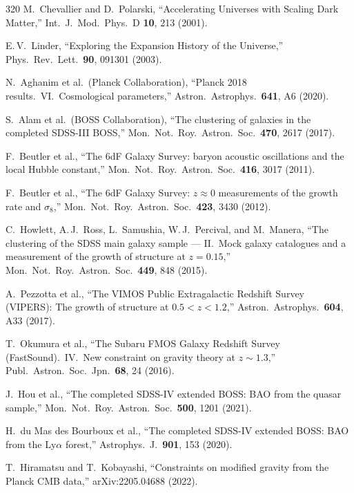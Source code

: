 \begin{thebibliography}{320}
M.\ Chevallier and D.\ Polarski,
``Accelerating Universes with Scaling Dark Matter,''
Int.\ J.\ Mod.\ Phys.\ D \textbf{10}, 213 (2001).

E.\,V.\ Linder,
``Exploring the Expansion History of the Universe,''
Phys.\ Rev.\ Lett.\ \textbf{90}, 091301 (2003).

N.\ Aghanim et al.\ (Planck Collaboration),
``Planck 2018 results.\ VI.\ Cosmological parameters,''
Astron.\ Astrophys.\ \textbf{641}, A6 (2020).

S.\ Alam et al.\ (BOSS Collaboration),
``The clustering of galaxies in the completed SDSS-III BOSS,''
Mon.\ Not.\ Roy.\ Astron.\ Soc.\ \textbf{470}, 2617 (2017).

F.\ Beutler et al.,
``The 6dF Galaxy Survey: baryon acoustic oscillations and the local Hubble constant,''
Mon.\ Not.\ Roy.\ Astron.\ Soc.\ \textbf{416}, 3017 (2011).

F.\ Beutler et al.,
``The 6dF Galaxy Survey: $z \approx 0$ measurements of the growth rate and $\sigma_8$,''
Mon.\ Not.\ Roy.\ Astron.\ Soc.\ \textbf{423}, 3430 (2012).

C.\ Howlett, A.\,J.\ Ross, L.\ Samushia, W.\,J.\ Percival, and M.\ Manera,
``The clustering of the SDSS main galaxy sample --- II.\ Mock galaxy catalogues and a measurement of the growth of structure at $z = 0.15$,''
Mon.\ Not.\ Roy.\ Astron.\ Soc.\ \textbf{449}, 848 (2015).

A.\ Pezzotta et al.,
``The VIMOS Public Extragalactic Redshift Survey (VIPERS): The growth of structure at $0.5 < z < 1.2$,''
Astron.\ Astrophys.\ \textbf{604}, A33 (2017).

T.\ Okumura et al.,
``The Subaru FMOS Galaxy Redshift Survey (FastSound).\ IV.\ New constraint on gravity theory at $z \sim 1.3$,''
Publ.\ Astron.\ Soc.\ Jpn.\ \textbf{68}, 24 (2016).

J.\ Hou et al.,
``The completed SDSS-IV extended BOSS: BAO from the quasar sample,''
Mon.\ Not.\ Roy.\ Astron.\ Soc.\ \textbf{500}, 1201 (2021).

H.\ du Mas des Bourboux et al.,
``The completed SDSS-IV extended BOSS: BAO from the Ly$\alpha$ forest,''
Astrophys.\ J.\ \textbf{901}, 153 (2020).

T.\ Hiramatsu and T.\ Kobayashi,
``Constraints on modified gravity from the Planck CMB data,''
arXiv:2205.04688 (2022).


\end{thebibliography}
